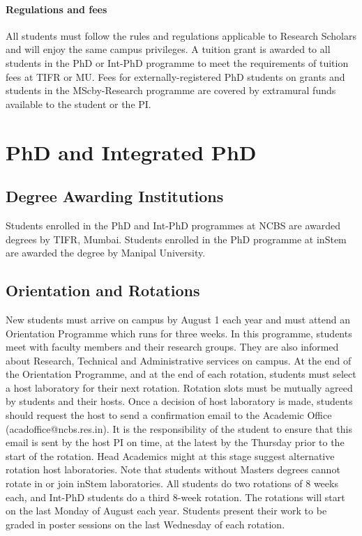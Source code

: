 \documentclass[a4paper]{extarticle}
\begin{document}
\paragraph{Regulations and fees} All students must follow the rules and
regulations applicable to Research Scholars and will enjoy the same campus
privileges. A tuition grant is awarded to all students in the PhD or Int-PhD
programme to meet the requirements of tuition fees at TIFR or MU. Fees for
externally-registered PhD students on grants and students in the MScby-Research
programme are covered by extramural funds available to the student or the PI.
	

\section{PhD and Integrated PhD} 

\subsection{Degree Awarding Institutions}
Students enrolled in the PhD and Int-PhD programmes at NCBS are awarded degrees
by TIFR, Mumbai. Students enrolled in the PhD programme at inStem are awarded
the degree by Manipal University.  

\subsection{Orientation and Rotations}
New students must
arrive on campus by August 1 each year and must attend an Orientation Programme
which runs for three weeks. In this programme, students meet with faculty
members and their research groups. They are also informed about Research,
Technical and Administrative services on campus. At the end of the Orientation
Programme, and at the end of each rotation, students must select a host
laboratory for their next rotation. Rotation slots must be mutually agreed by
students and their hosts. Once a decision of host laboratory is made, students
should request the host to send a confirmation email to the Academic Office
(acadoffice@ncbs.res.in). It is the responsibility of the student to ensure that
this email is sent by the host PI on time, at the latest by the Thursday prior
to the start of the rotation. Head Academics might at this stage suggest
alternative rotation host laboratories. Note that students without Masters
degrees cannot rotate in or join inStem laboratories. All students do two
rotations of 8 weeks each, and Int-PhD students do a third 8-week rotation. The
rotations will start on the last Monday of August each year. Students present
their work to be graded in poster sessions on the last Wednesday of each
rotation.  
\end{document}
